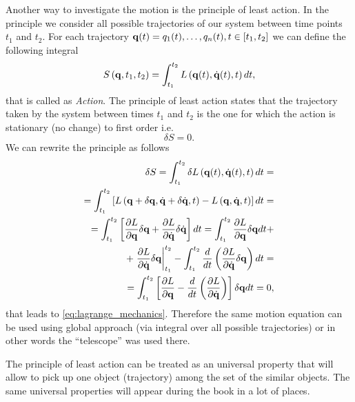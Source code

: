 Another way to investigate the motion is the principle of least
action.  In the principle we consider
all possible trajectories of our system between time points $t_1$ and
$t_2$. For each trajectory ${\bf q}(t) = {q_1(t), \dots, q_n(t)}, t
\in [t_1, t_2]$ we can define the following integral
\begin{equation}
S\left({\bf q}, t_1, t_2\right) = \int_{t_1}^{t_2}L\left({\bf q}(t), 
\dot{\bf q}(t), t\right) dt,
\label{eq:action}
\end{equation}
that is called as \textit{Action}. The principle of least action
states that the trajectory taken by the system between times $t_1$ and
$t_2$ is the one for which the action is stationary (no change) to
first order \cite{wiki:least_action_principle} i.e.
\[
\delta S = 0.
\]
We can rewrite the principle as follows
\begin{eqnarray}
\delta S = 
\int_{t_1}^{t_2} \delta L\left({\bf q}(t), 
\dot{\bf q}(t), t\right) dt = 
\nonumber \\
=
\int_{t_1}^{t_2} \left[L\left({\bf q} + \delta {\bf q} , 
\dot{\bf q} + \delta \dot{\bf q}, t\right) - L\left({\bf q}, 
\dot{\bf q}, t\right)\right] dt = 
\nonumber \\
= 
\int_{t_1}^{t_2} \left[\frac{\partial L}{\partial {\bf q}} \delta {\bf
    q} + \frac{\partial L}{\partial \dot{\bf q}} \delta \dot{\bf
    q}\right] dt =  
\int_{t_1}^{t_2} \frac{\partial L}{\partial {\bf q}} \delta {\bf
    q} dt 
+
\nonumber \\
+
\left. \frac{\partial L}{\partial \dot{\bf q}} \delta {\bf q} \right|_{t_1}^{t_2} - 
\int_{t_1}^{t_2} \frac{d}{d t} \left( \frac{\partial L}{\partial
  \dot{\bf q}} \delta {\bf q}\right) dt = 
\nonumber \\
= \int_{t_1}^{t_2} \left[
\frac{\partial L}{\partial {\bf q}} -
\frac{d}{d t} \left( \frac{\partial L}{\partial
  \dot{\bf q}} \right)
\right] \delta {\bf q} dt = 0,
\nonumber
\end{eqnarray}
that leads to \eqref{eq:lagrange_mechanics}. Therefore the same motion
equation can be used using global approach (via integral over all
possible trajectories) or in other words the ``telescope'' was used
there. 

\begin{remark}
\label{rem:universalpropertymechanics}
The principle of least action can be treated as an universal property
that will allow to pick up one object (trajectory) among the set
of the similar objects. The same universal properties will appear
during the book in a lot of places.
\end{remark}

